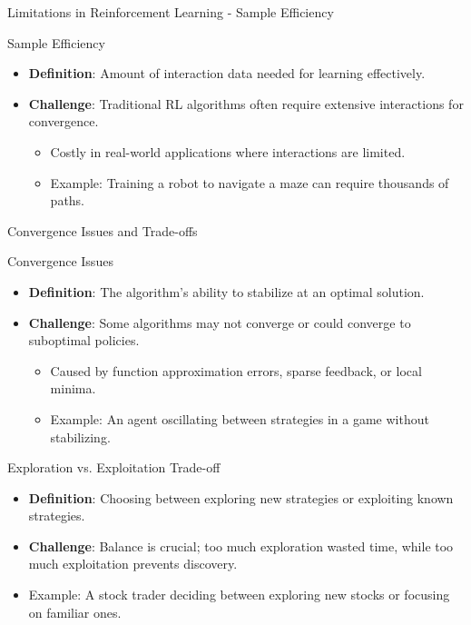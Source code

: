 \documentclass[aspectratio=169]{beamer}
\begin{document}
\begin{frame}[fragile]{Limitations in Reinforcement Learning - Sample Efficiency}
    \begin{block}{Sample Efficiency}
        \begin{itemize}
            \item \textbf{Definition}: Amount of interaction data needed for learning effectively.
            \item \textbf{Challenge}: Traditional RL algorithms often require extensive interactions for convergence.
            \begin{itemize}
                \item Costly in real-world applications where interactions are limited.
                \item Example: Training a robot to navigate a maze can require thousands of paths.
            \end{itemize}
        \end{itemize}
    \end{block}
\end{frame}

\begin{frame}[fragile]{Convergence Issues and Trade-offs}
    \begin{block}{Convergence Issues}
        \begin{itemize}
            \item \textbf{Definition}: The algorithm's ability to stabilize at an optimal solution.
            \item \textbf{Challenge}: Some algorithms may not converge or could converge to suboptimal policies.
            \begin{itemize}
                \item Caused by function approximation errors, sparse feedback, or local minima.
                \item Example: An agent oscillating between strategies in a game without stabilizing.
            \end{itemize}
        \end{itemize}
    \end{block}

    \begin{block}{Exploration vs. Exploitation Trade-off}
        \begin{itemize}
            \item \textbf{Definition}: Choosing between exploring new strategies or exploiting known strategies.
            \item \textbf{Challenge}: Balance is crucial; too much exploration wasted time, while too much exploitation prevents discovery.
            \item Example: A stock trader deciding between exploring new stocks or focusing on familiar ones.
        \end{itemize}
    \end{block}
\end{frame}
\end{document}
